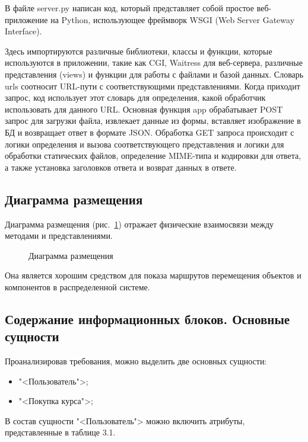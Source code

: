 В файле server.py написан код, который представляет собой простое веб-приложение на Python, использующее фреймворк WSGI (Web Server Gateway Interface).

Здесь импортируются различные библиотеки, классы и функции, которые используются в приложении, такие как CGI, Waitress для веб-сервера, различные представления (views) и функции для работы с файлами и базой данных. Словарь urls соотносит URL-пути с соответствующими представлениями. Когда приходит запрос, код использует этот словарь для определения, какой обработчик использовать для данного URL. Основная функция app обрабатывает POST запрос для загрузки файла, извлекает данные из формы, вставляет изображение в БД и возвращает ответ в формате JSON. Обработка GET запроса происходит с логики определения и вызова соответствующего представления и логики для обработки статических файлов, определение MIME-типа и кодировки для ответа, а также установка заголовков ответа и возврат данных в ответе.

\subsection{Диаграмма размещения}

Диаграмма размещения (рис.~\ref{place:image}) отражает физические взаимосвязи между методами и представлениями.

\vspace{-8mm} %
\begin{figure}[ht]
\caption{Диаграмма размещения}
\label{place:image}
\end{figure}

Она является хорошим средством для показа маршрутов перемещения объектов и компонентов в распределенной системе.

\subsection{Содержание информационных блоков. Основные сущности}

Проанализировав требования, можно выделить две основных сущности:
\begin{itemize}
	\item "<Пользователь">;
	\item "<Покупка курса">;
\end{itemize}

В состав сущности "<Пользователь"> можно включить атрибуты, представленные в таблице 3.1.

